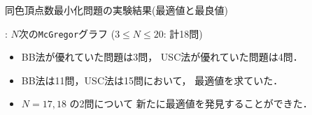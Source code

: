 \documentclass[dvipdfmx,11pt]{beamer}
\newcommand{\code}[1]{\lstinline[basicstyle=\ttfamily]{#1}}
\begin{document}
\begin{frame}[noframenumbering]{同色頂点数最小化問題の実験結果(最適値と最良値)}
 \thispagestyle{empty}
 \begin{block}{}
  : $N$次の\code{McGregor}グラフ ($3 \leq N\leq 20$: 計18問)
 \end{block}

 \begin{center}
  
 \end{center}

 \begin{itemize}
  \item BB法が優れていた問題は3問，
        USC法が優れていた問題は4問．
  \item BB法は11問，USC法は15問において，
	最適値を求ていた．
  \item $N = 17,18$ の2問について
	新たに最適値を発見することができた．
 \end{itemize}
\end{frame}
\end{document}
